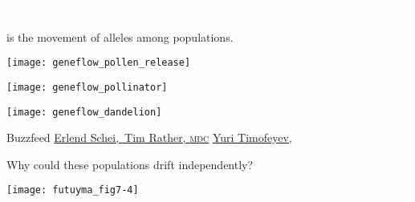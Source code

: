 \documentclass[t]{beamer}
\newcommand{\futuyma}[1]{%
	\ifthenelse{\isempty{#1}}%
	{Futuyma \& Kirkpatrick 2017, 4th ed.}%
	{Fig.~#1~Futuyma \& Kirkpatrick 2017, 4th ed.}%
}
\begin{document}

{
\begin{frame}[b]

\tiny \textcolor{white}{\futuyma{}}
\end{frame}
}


\begin{frame}{ is the movement of alleles among populations.}

\vspace{-\baselineskip}

\begin{multicols}{2}
\centering
\noindent\texttt{[image: geneflow\_pollen\_release]}

\vspace{1ex}

\noindent\texttt{[image: geneflow\_pollinator]}

\columnbreak

\noindent\texttt{[image: geneflow\_dandelion]}

\vspace{1ex}

\noindent{}

\end{multicols}

\vfilll

\tiny Buzzfeed \hfill \href{https://www.flickr.com/photos/22786627@N04/3584415133}{Erlend Schei, }\newline
\href{https://nature.mdc.mo.gov/discover-nature/field-guide/megachilid-bees}{\textcopyright\,Tim Rather, \textsc{mdc}} \hfill \href{https://www.flickr.com/photos/yuri_timofeyev/3140287109}{Yuri Timofeyev, }

\end{frame}



\begin{frame}[t]{Why could these populations drift independently?}
\centering

\texttt{[image: futuyma\_fig7-4]}


\end{frame}

\end{document}
